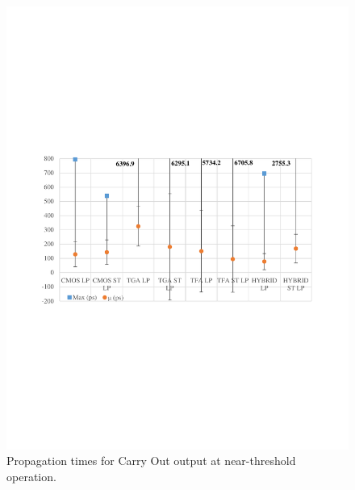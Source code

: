 \documentclass[ecp,tc, english]{iiufrgs}
\begin{document}
\begin{figure}[H]
\centering
\includegraphics[width=\textwidth, trim={0 9cm 0 9cm},clip]{delaysNTCarryOut.pdf}
\caption{Propagation times for Carry Out output at near-threshold operation.}
\label{fig:Fig46}
\end{figure}
\end{document}
